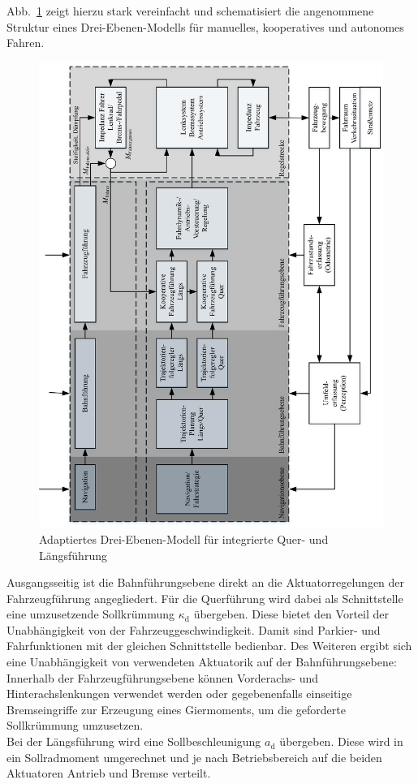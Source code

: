 Abb.~\ref{fig:3EM} zeigt hierzu stark vereinfacht und schematisiert die angenommene Struktur eines Drei-Ebenen-Modells für manuelles, kooperatives und autonomes Fahren.
\begin{figure}[htp!]
  \centering
    \includegraphics[scale=0.7]
    {Bilder/01/3EM.eps}
    \caption{Adaptiertes Drei-Ebenen-Modell für integrierte Quer- und Längsführung}
    \label{fig:3EM}
\end{figure}
Ausgangsseitig ist die Bahnführungsebene direkt an die Aktuatorregelungen der Fahrzeugführung angegliedert. Für die Querführung wird dabei als Schnittstelle eine umzusetzende Sollkrümmung $\kappa_\mathrm{d}$ übergeben.  Diese bietet den Vorteil der Unabhängigkeit von der Fahrzeuggeschwindigkeit. Damit sind Parkier- und Fahrfunktionen mit der gleichen Schnittstelle bedienbar. Des Weiteren ergibt sich eine Unabhängigkeit von verwendeten Aktuatorik auf der Bahnführungsebene: Innerhalb der Fahrzeugführungsebene können Vorderachs- und Hinterachslenkungen verwendet werden oder gegebenenfalls einseitige Bremseingriffe zur Erzeugung eines Giermoments, um die geforderte Sollkrümmung umzusetzen.\\ 
Bei der Längsführung wird eine Sollbeschleunigung $a_\mathrm{d}$ übergeben. Diese wird in ein Sollradmoment umgerechnet und je nach Betriebsbereich auf die beiden Aktuatoren Antrieb und Bremse verteilt. 

